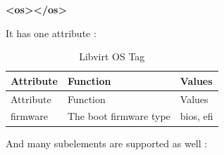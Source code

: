 \documentclass[
  14pt,
  english,
  a4paper,
]{scrreprt}
\newenvironment{Shaded}{}{}
\newcommand{\KeywordTok}[1]{\textcolor[rgb]{0.00,0.44,0.13}{\textbf{#1}}}
\begin{document}
\begin{Shaded}
\begin{Highlighting}[]
\KeywordTok{\textless{}os\textgreater{}\textless{}/os\textgreater{}}
\end{Highlighting}
\end{Shaded}

It has one attribute :

\hypertarget{tbl:lvirt_os_tag}{}
\begin{longtable}[]{@{}lll@{}}
\caption{\label{tbl:lvirt_os_tag}Libvirt OS Tag}\tabularnewline
\toprule
\begin{minipage}[b]{0.15\columnwidth}\raggedright
Attribute\strut
\end{minipage} & \begin{minipage}[b]{0.32\columnwidth}\raggedright
Function\strut
\end{minipage} & \begin{minipage}[b]{0.15\columnwidth}\raggedright
Values\strut
\end{minipage}\tabularnewline
\midrule
\endfirsthead
\toprule
\begin{minipage}[b]{0.15\columnwidth}\raggedright
Attribute\strut
\end{minipage} & \begin{minipage}[b]{0.32\columnwidth}\raggedright
Function\strut
\end{minipage} & \begin{minipage}[b]{0.15\columnwidth}\raggedright
Values\strut
\end{minipage}\tabularnewline
\midrule
\endhead
\begin{minipage}[t]{0.15\columnwidth}\raggedright
firmware\strut
\end{minipage} & \begin{minipage}[t]{0.32\columnwidth}\raggedright
The boot firmware type\strut
\end{minipage} & \begin{minipage}[t]{0.15\columnwidth}\raggedright
bios, efi\strut
\end{minipage}\tabularnewline
\bottomrule
\end{longtable}

And many subelements are supported as well :
\end{document}
